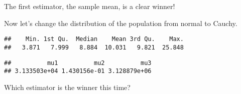 \begin{illustration}
The first estimator, the sample mean, is a clear winner!
\end{illustration}

\begin{illustration}
\label{example:has-cauchy}
Now let's change the distribution of the population from normal to Cauchy.
\begin{knitrout}
\color{fgcolor}\begin{kframe}
\begin{alltt}
\hlstd{(}\hlstd{)}
 \hlkwb{<-} \hlstd{(}\hlstd{,}  \hlstd{=}\hlopt{-} \hlstd{,}  \hlstd{=} \hlstd{)}
 \hlkwb{<-}   
\end{alltt}
\begin{verbatim}
##    Min. 1st Qu.  Median    Mean 3rd Qu.    Max. 
##   3.871   7.999   8.884  10.031   9.821  25.848
\end{verbatim}
\begin{alltt}
 \hlkwb{<-} \hlstd{(}\hlstd{,} \hlstd{) \{}
     \hlkwb{<-}   
     \hlkwb{<-}  \hlstd{(} \hlstd{=}   \hlstd{=}   \hlstd{=} \hlstd{(}
     \hlopt{-} \hlopt{^}\hlstd{)}
\hlstd{\}}

 \hlkwb{<-}  
\end{alltt}
\begin{verbatim}
##          mu1          mu2          mu3 
## 3.133503e+04 1.430156e-01 3.128879e+06
\end{verbatim}
\end{kframe}
\end{knitrout}
Which estimator is the winner this time?
\end{illustration}


